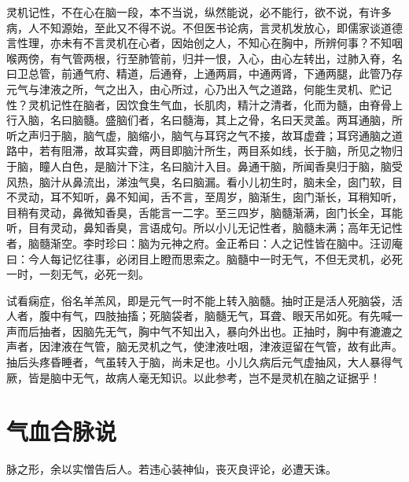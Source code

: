\documentclass[a4paper,12pt,UTF8,twoside]{ctexbook}
\begin{document}
	
	灵机记性，不在心在脑一段，本不当说，纵然能说，必不能行，欲不说，有许多病，人不知源始，至此又不得不说。不但医书论病，言灵机发放心，即儒家谈道德言性理，亦未有不言灵机在心者，因始创之人，不知心在胸中，所辨何事？不知咽喉两傍，有气管两根，行至肺管前，归并一恨，入心，由心左转出，过肺入脊，名曰卫总管，前通气府、精道，后通脊，上通两肩，中通两肾，下通两腿，此管乃存元气与津液之所，气之出入，由心所过，心乃出入气之道路，何能生灵机、贮记性？灵机记性在脑者，因饮食生气血，长肌肉，精汁之清者，化而为髓，由脊骨上行入脑，名曰脑髓。盛脑们者，名曰髓海，其上之骨，名曰天灵盖。两耳通脑，所听之声归于脑，脑气虚，脑缩小，脑气与耳窍之气不接，故耳虚聋；耳窍通脑之道路中，若有阻滞，故耳实聋，两目即脑汁所生，两目系如线，长于脑，所见之物归于脑，瞳人白色，是脑汁下注，名曰脑汁入目。鼻通干脑，所闻香臭归于脑，脑受风热，脑汁从鼻流出，涕浊气臭，名曰脑漏。看小儿初生时，脑未全，囱门软，目不灵动，耳不知听，鼻不知闻，舌不言，至周岁，脑渐生，囱门渐长，耳稍知听，目稍有灵动，鼻微知香臭，舌能言一二字。至三四岁，脑髓渐满，囱门长全，耳能听，目有灵动，鼻知香臭，言语成句。所以小儿无记性者，脑髓未满；高年无记性者，脑髓渐空。李时珍曰：脑为元神之府。金正希曰：人之记性皆在脑中。汪讱庵曰：今人每记忆往事，必闭目上瞪而思索之。脑髓中一时无气，不但无灵机，必死一时，一刻无气，必死一刻。
	
	试看痫症，俗名羊羔风，即是元气一时不能上转入脑髓。抽时正是活人死脑袋，活人者，腹中有气，四肢抽搐；死脑袋者，脑髓无气，耳聋、眼天吊如死。有先喊一声而后抽者，因脑先无气，胸中气不知出入，暴向外出也。正抽时，胸中有漉漉之声者，因津液在气管，脑无灵机之气，使津液吐咽，津液逗留在气管，故有此声。抽后头疼昏睡者，气虽转入于脑，尚未足也。小儿久病后元气虚抽风，大人暴得气厥，皆是脑中无气，故病人毫无知识。以此参考，岂不是灵机在脑之证据乎！
	
	\chapter{气血合脉说}
	
	
	脉之形，余以实憎告后人。若违心装神仙，丧灭良评论，必遭天诛。
	
\end{document}
